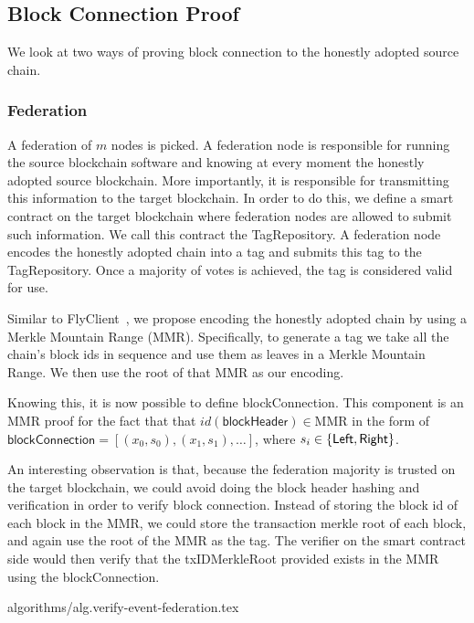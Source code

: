 \subsection{Block Connection Proof}

We look at two ways of proving block connection to the honestly adopted source chain.

\subsubsection{Federation}
A federation of $m$ nodes is picked. A federation node is responsible for running the source blockchain software and knowing at every moment the honestly adopted source blockchain. More importantly, it is responsible for transmitting this information to the target blockchain. In order to do this, we define a smart contract on the target blockchain where federation nodes are allowed to submit such information. We call this contract the \textsf{TagRepository}. A federation node encodes the honestly adopted chain into a tag and submits this tag to the \textsf{TagRepository}. Once a majority of votes is achieved, the tag is considered valid for use.

Similar to FlyClient~\cite{flyclient}, we propose encoding the honestly adopted chain by using a Merkle Mountain Range (MMR). Specifically, to generate a tag we take all the chain's block ids in sequence and use them as leaves in a Merkle Mountain Range. We then use the root of that MMR as our encoding.

Knowing this, it is now possible to define \textsf{blockConnection}. This component is an MMR proof for the fact that that $id(\mathsf{blockHeader}) \in \text{MMR}$ in the form of $\mathsf{blockConnection} = [(x_0, s_0), (x_1, s_1), \dots]$, where $s_i \in \sf\{Left, Right\}$.

An interesting observation is that, because the federation majority is trusted on the target blockchain, we could avoid doing the block header hashing and verification in order to verify block connection. Instead of storing the block id of each block in the MMR, we could store the transaction merkle root of each block, and again use the root of the MMR as the tag. The verifier on the smart contract side would then verify that the \textsf{txIDMerkleRoot} provided exists in the MMR using the \textsf{blockConnection}.

{algorithms/alg.verify-event-federation.tex}


